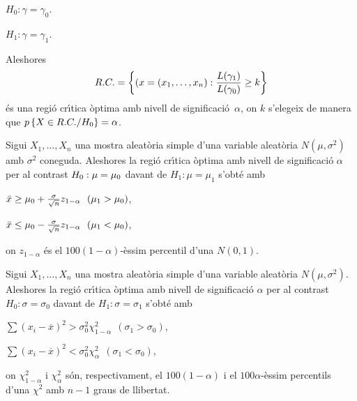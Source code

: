 \begin{description}
\item $H_0: \gamma = \gamma_0$.

\item $H_1: \gamma = \gamma_1$.
\end{description}

Aleshores
$$ R.C. = \left\{ (x = (x_1, \ldots , x_n) : {L(\gamma_1) \over
L(\gamma_0)} \geq k \right\}$$
\'es una regi\'o cr\'{\i}tica \`optima 
amb nivell de significaci\'o~$\alpha$, on $k$
s'elegeix de manera que $p\left\{X \in R.C. /H_0\right\} = \alpha$.

\begin{proposition}
Sigui $X_1, \ldots , X_n$ una mostra aleat\`oria simple d'una
variable alea\-t\`oria $N(\mu,\sigma^2)$ amb $\sigma^2$ coneguda. 
Aleshores la regi\'o cr\'{\i}tica \`optima amb nivell de significaci\'o $\alpha$ per al contrast $H_0: \mu =
\index{regio@regi\'o!critica@cr\'{\i}tica!optima@\`optima}
\index{nivell!de significacio@de significaci\'o}
\mu_0$ davant de $H_1: \mu = \mu_1$ s'obt\'e amb 
\begin{description}
\item $\bar{x} \geq \mu_0 + {\sigma \over \sqrt{n}} z_{1-\alpha} \ \ (\mu_1 >
\mu_0)$,

\item $\bar{x} \leq \mu_0 - {\sigma \over \sqrt{n}} z_{1-\alpha} \ \ (\mu_1 <
\mu_0)$,
\end{description}
on $z_{1-\alpha}$ \'es el $100(1-\alpha)$-\`essim percentil d'una $N(0,1)$.
\end{proposition}

\begin{proposition}
Sigui $X_1, \ldots , X_n$ una mostra aleat\`oria simple d'una
variable alea\-t\`oria $N(\mu,\sigma^2)$. Aleshores la regi\'o
cr\'{\i}tica \`optima amb nivell de significaci\'o $\alpha$ per al contrast $H_0: \sigma
= \sigma_0$ davant de $H_1: \sigma = \sigma_1$ s'obt\'e amb
\begin{description}
\item $\sum (x_i - \overline{x})^2 > \sigma_0^2 \chi_{1-\alpha}^2 \ \ (\sigma_1 >
\sigma_0)$,

\item $\sum (x_i - \overline{x})^2 < \sigma_0^2 \chi_\alpha^2 \ \ (\sigma_1 < \sigma_0)$,
\end{description}
on $\chi_{1-\alpha}^2$ i $\chi_\alpha^2$ s\'on, respectivament, el $100(1-\alpha)$
i el $100\alpha$-\`essim percentils d'una $\chi^2$ amb $n-1$ graus de llibertat.
\end{proposition}

